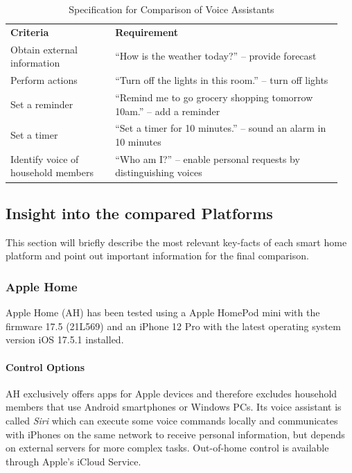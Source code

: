 \begin{table}[H]
    \centering
    \caption{Specification for Comparison of Voice Assistants}
    \label{tab:spec_voiceassistant}
    \begin{tabular}{ >{\raggedright} p{0.3\linewidth} p{0.65\linewidth} }
        \toprule
        \multicolumn{2}{ l }{\textbf{Voice Assistants}} \\
        \midrule
        \textbf{Criteria} & \textbf{Requirement} \\
        \midrule
        Obtain external information & “How is the weather today?” – provide forecast \\ \addlinespace
        Perform actions & “Turn off the lights in this room.” – turn off lights \\ \addlinespace
        Set a reminder & “Remind me to go grocery shopping tomorrow 10am.” – add a reminder \\ \addlinespace
        Set a timer & “Set a timer for 10 minutes.” – sound an alarm in 10 minutes \\ \addlinespace
        Identify voice of household members & “Who am I?” – enable personal requests by distinguishing voices \\
        \bottomrule
    \end{tabular}
\end{table}

\newpage

\subsection{Insight into the compared Platforms} \label{sec:obs_evaluation}

This section will briefly describe the most relevant key-facts of each smart home platform and point out important information for the final comparison.

\subsubsection{Apple Home}
Apple Home (AH) has been tested using a Apple HomePod mini with the firmware 17.5 (21L569) and an iPhone 12 Pro with the latest operating system version iOS 17.5.1 installed.

\paragraph{Control Options}
AH exclusively offers apps for Apple devices and therefore excludes household members that use Android smartphones or Windows PCs. Its voice assistant is called \textit{Siri} which can execute some voice commands locally and communicates with iPhones on the same network to receive personal information, but depends on external servers for more complex tasks. Out-of-home control is available through Apple's iCloud Service.

